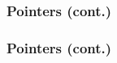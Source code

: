 \documentclass[aspectratio=169]{beamer}
\begin{document}
\begin{frame}
  \frametitle{Pointers (cont.)}
\end{frame}

\begin{frame}
  \frametitle{Pointers (cont.)}
\end{frame}
\end{document}
